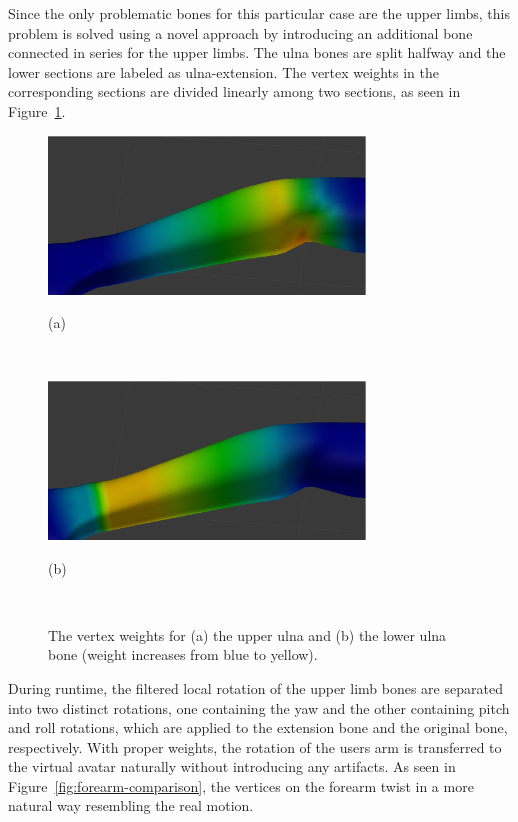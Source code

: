 Since the only problematic bones for this particular case are the upper limbs, this problem is solved using a novel approach by introducing an additional bone connected in series for the upper limbs. The ulna bones are split halfway and the lower sections are labeled as ulna-extension. The vertex weights in the corresponding sections are divided linearly among two sections, as seen in Figure~\ref{fig:forearm-weights}. 


\begin{figure}[htbp]
	\centerline{\includegraphics[width=0.75\textwidth]{./figures/ulna-weight.eps}}
	\centerline{(a)}
	\centerline{\ }
	\centerline{\includegraphics[width=0.75\textwidth]{./figures/ulna-extent-weight.eps}}
	\centerline{(b)} 
	\centerline{\ } 
	\caption{The vertex weights for (a) the upper ulna and (b) the lower ulna bone (weight increases from blue to yellow).}
	\label{fig:forearm-weights}
\end{figure}

During runtime, the filtered local rotation of the upper limb bones are separated into two distinct rotations, one containing the yaw and the other containing pitch and roll rotations, which are applied to the extension bone and the original bone, respectively. With proper weights, the rotation of the users arm is transferred to the virtual avatar naturally without introducing any artifacts. As seen in Figure~\ref{fig:forearm-comparison}, the vertices on the forearm twist in a more natural way resembling the real motion.

